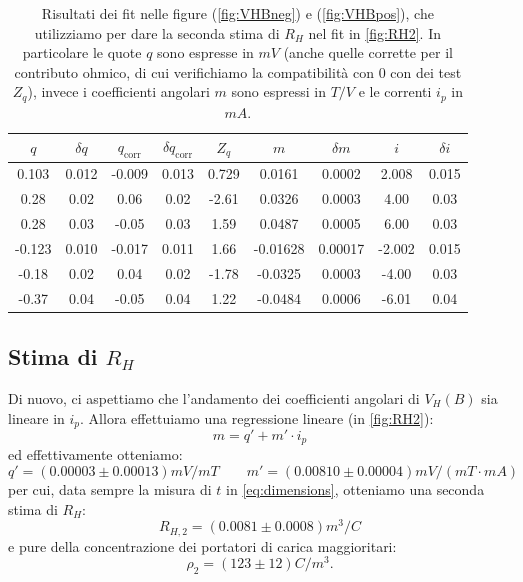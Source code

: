 \begin{table}
\centering \small
\begin{tabular}{ccccc|cccc}
  $q$ & $\delta q$ & $q_\text{corr}$ & $\delta q_\text{corr}$ & $ Z_q $ & $m$ & $\delta m$ & $i$ & $\delta i$ \\
\hline
  0.103 & 0.012 & -0.009 & 0.013 & 0.729 & 0.0161 & 0.0002 & 2.008 & 0.015\\
  0.28 & 0.02 & 0.06 & 0.02 & -2.61 & 0.0326 & 0.0003 & 4.00 & 0.03\\
  0.28 & 0.03 & -0.05 & 0.03 & 1.59 & 0.0487 & 0.0005 & 6.00 & 0.03\\
  -0.123 & 0.010 & -0.017 & 0.011 & 1.66 & -0.01628 & 0.00017 & -2.002 & 0.015\\
  -0.18 & 0.02 & 0.04 & 0.02 &-1.78& -0.0325 & 0.0003 & -4.00 & 0.03\\
  -0.37 & 0.04 & -0.05 & 0.04 &1.22& -0.0484 & 0.0006 & -6.01 & 0.04
\end{tabular}
\caption{Risultati dei fit nelle figure (\ref{fig:VHBneg}) e (\ref{fig:VHBpos}), che utilizziamo per dare la seconda stima di $ R_H $ nel fit in \cref{fig:RH2}. In particolare le quote $ q $ sono espresse in $ \unit{mV} $ (anche quelle corrette per il contributo ohmico, di cui verifichiamo la compatibilità con $ 0 $ con dei test $ Z_q $), invece i coefficienti angolari $ m $ sono espressi in $ \unit{T/V} $ e le correnti $ i_p $ in $ \unit{mA} $.}
\label{tab:VHb-fits}
\end{table}

\subsection{Stima di $ R_H $}

Di nuovo, ci aspettiamo che l'andamento dei coefficienti angolari di $ V_H(B) $ sia lineare in $ i_p $.
Allora effettuiamo una regressione lineare (in \cref{fig:RH2}):
\begin{equation}
m = q' + m' \cdot i_p
\end{equation}
ed effettivamente otteniamo:
\begin{equation}
q'= (0.00003 \pm 0.00013)\unit{mV / mT} \qquad m' = (0.00810 \pm 0.00004) \unit{mV / (mT \cdot mA)}
\end{equation}
per cui, data sempre la misura di $ t $ in \cref{eq:dimensions}, otteniamo una seconda stima di $ R_H $:
\begin{equation}
R_{H,2} = (0.0081 \pm 0.0008) \unit{m^3 / C}
\end{equation}
e pure della concentrazione dei portatori di carica maggioritari:
\begin{equation}
\rho_2 = (123 \pm 12) \unit{C / m^3}.
\end{equation}

